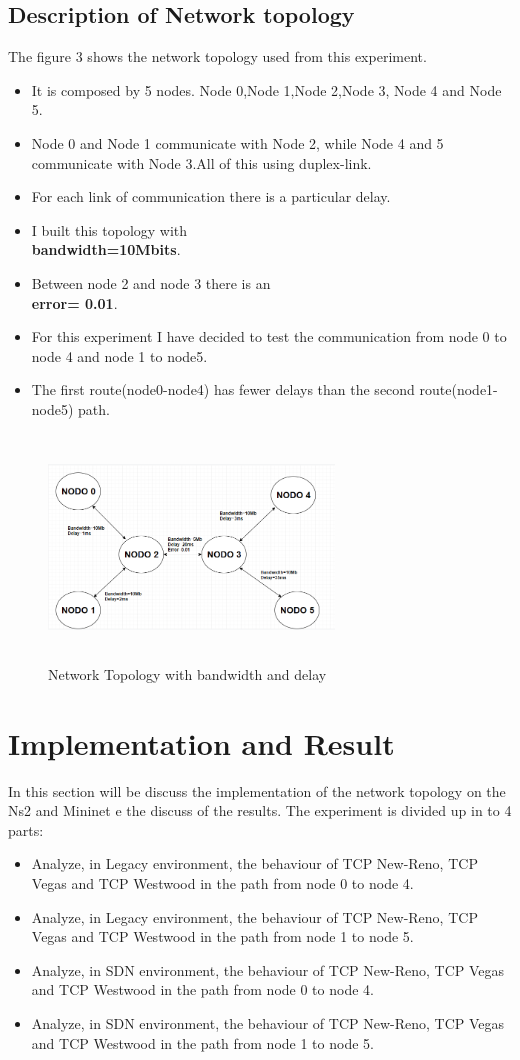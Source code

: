 {{\subsection{Description of Network topology}{
	The figure 3 shows the network topology used from this experiment.
	\begin{itemize} 
		\item It is composed by 5 nodes. Node 0,Node 1,Node 2,Node 3, Node 4 and Node 5. 
		\item Node 0 and Node 1 communicate with Node 2, while Node 4 and 5 communicate with Node 3.All of this using duplex-link.
		\item For each link of communication there is a particular delay.
		\item I built this topology with\\ \textbf{bandwidth=10Mbits}.
		\item Between node 2 and node 3 there is an\\ \textbf{error= 0.01}.
		\item For this experiment I have decided to test the communication from node 0 to node 4 and node 1 to node5.
		\item The first route(node0-node4) has fewer delays than the second route(node1-node5) path. 
	\end{itemize}
}
\begin{figure}[!htb]
	\includegraphics[width=7.6cm,height=6.0cm]{figura3}
	\caption{Network Topology with bandwidth and delay}
	\label{figure}
\end{figure}
}
\section{\normalsize Implementation and Result}{
In this section will be discuss the implementation of the network topology on the Ns2 and Mininet e the discuss of the results. The experiment is divided up in to 4 parts:
\begin {itemize}
\item Analyze, in Legacy environment, the behaviour of TCP New-Reno, TCP Vegas and TCP Westwood in the path from node 0 to node 4.
\item Analyze, in Legacy environment, the behaviour of TCP New-Reno, TCP Vegas and TCP Westwood in the path from node 1 to node 5.
\item Analyze, in SDN environment, the behaviour of TCP New-Reno, TCP Vegas and TCP Westwood in the path from node 0 to node 4.
\item Analyze, in SDN environment, the behaviour of TCP New-Reno, TCP Vegas and TCP Westwood in the path from node 1 to node 5.
\end{itemize}
}}
